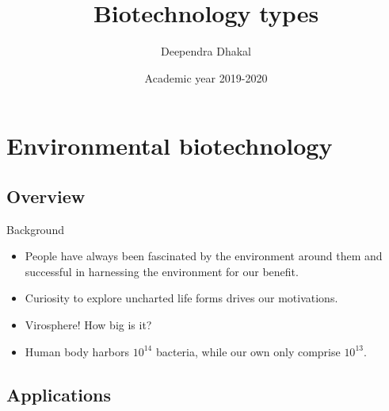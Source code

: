 \documentclass[ignorenonframetext,aspectratio=169]{beamer}
\title{Biotechnology types}
\author{Deependra Dhakal}
\institute{GAASC, Baitadi \and Tribhuwan University}
\date{Academic year 2019-2020}
\providecommand{\tightlist}{%
  \setlength{\itemsep}{0pt}\setlength{\parskip}{0pt}}
\begin{document}
\frame{\titlepage}

\begin{frame}
\tableofcontents[hideallsubsections]
\end{frame}
\hypertarget{environmental-biotechnology}{%
\section{Environmental
biotechnology}\label{environmental-biotechnology}}

\hypertarget{overview}{%
\subsection{Overview}\label{overview}}

\begin{frame}{Background}
\protect\hypertarget{background}{}

\begin{itemize}
\tightlist
\item
  People have always been fascinated by the environment around them and
  successful in harnessing the environment for our benefit.
\item
  Curiosity to explore uncharted life forms drives our motivations.
\item
  Virosphere! How big is it?
\item
  Human body harbors \(10^14\) bacteria, while our own only comprise
  \(10^13\).
\end{itemize}

\end{frame}

\hypertarget{applications}{%
\subsection{Applications}\label{applications}}
\end{document}
